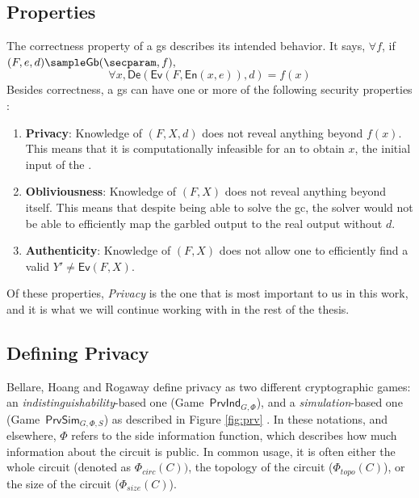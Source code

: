 \subsection{Properties}
\label{subsec: garblingschemeprops}
The correctness property of a \acrlong{gs} describes its intended behavior. It says, $\forall f$, if $(F,e,d) \sample \mathsf{Gb}(\secparam,f),$
\[ \forall x, \mathsf{De}(\mathsf{Ev}(F,\mathsf{En}(x,e)),d) = f(x)\]
Besides correctness, a \acrlong{gs} can have one or more of the following security properties \cite{bellare_foundations_2012}:
\begin{enumerate}
    \item \textbf{Privacy}: Knowledge of $(F,X,d)$ does not reveal anything beyond $f(x)$. This means that it is computationally infeasible for an \cevaluator to obtain $x$, the initial input of the \cgarbler.
    \item \textbf{Obliviousness}: Knowledge of $(F,X)$ does not reveal anything beyond itself. This means that despite being able to solve the \acrlong{gc}, the solver would not be able to efficiently map the garbled output to the real output without $d$.
    \item \textbf{Authenticity}: Knowledge of $(F, X)$ does not allow one to efficiently find a valid $Y'\neq \mathsf{Ev}(F,X)$. 
\end{enumerate}

Of these properties, \textit{Privacy} is the one that is most important to us in this work, and it is what we will continue working with in the rest of the thesis.



\subsection{Defining Privacy}
\label{sec:defininigprivacy}
Bellare, Hoang and Rogaway define privacy as two different cryptographic games: an \textit{indistinguishability}-based one (Game\ $\mathsf{PrvInd_\mathit{G,\Phi}}$), and a \textit{simulation}-based one (Game\ $\mathsf{PrvSim_\mathit{G,\Phi,S}}$) as described in Figure \ref{fig:prv} \cite{bellare_foundations_2012}.
In these notations, and elsewhere, $\mathit{\Phi}$ refers to the side information function, which describes how much information about the circuit is public. In common usage, it is often either the whole circuit (denoted as $\mathit{\Phi_{circ}(C))}$, the topology of the circuit ($\mathit{\Phi_{topo}(C)}$), or the size of the circuit ($\mathit{\Phi_{size}(C)}$). 

